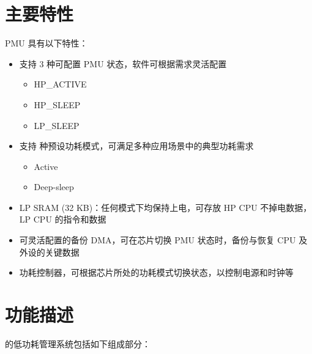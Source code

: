 \documentclass[main\_\_CN.tex]{subfiles}
\begin{document}
\section{主要特性}

PMU 具有以下特性：

\begin{itemize}
\item 支持 3 种可配置 PMU 状态，软件可根据需求灵活配置
    \begin{itemize}
    \item HP\_ACTIVE
    \item HP\_SLEEP
    \item LP\_SLEEP
    \end{itemize}

\item 支持  种预设功耗模式，可满足多种应用场景中的典型功耗需求
    \begin{itemize}
    \item Active
    \item Deep-sleep
    \end{itemize}

\item LP SRAM (32 KB)：任何模式下均保持上电，可存放 HP CPU 不掉电数据，LP CPU 的指令和数据

\item 可灵活配置的备份 DMA，可在芯片切换 PMU 状态时，备份与恢复 CPU 及外设的关键数据

\item 功耗控制器，可根据芯片所处的功耗模式切换状态，以控制电源和时钟等
\end{itemize}

\section{功能描述}

\chipname{} 的低功耗管理系统包括如下组成部分：
\end{document}

